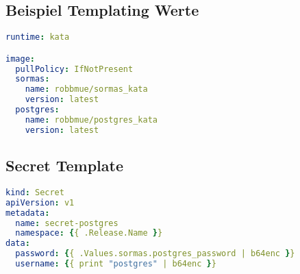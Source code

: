 \subsection{Beispiel Templating Werte}
\hfill \newline
\label{app:values_yaml}
\begin{lstlisting}[language=yaml]
runtime: kata

image:
  pullPolicy: IfNotPresent
  sormas: 
    name: robbmue/sormas_kata
    version: latest
  postgres:
    name: robbmue/postgres_kata
    version: latest
\end{lstlisting}

\subsection{Secret Template}
\hfill \newline
\label{app:secret_template}
\begin{lstlisting}[language=yaml]
kind: Secret
apiVersion: v1
metadata: 
  name: secret-postgres
  namespace: {{ .Release.Name }}
data: 
  password: {{ .Values.sormas.postgres_password | b64enc }}
  username: {{ print "postgres" | b64enc }}
\end{lstlisting}

